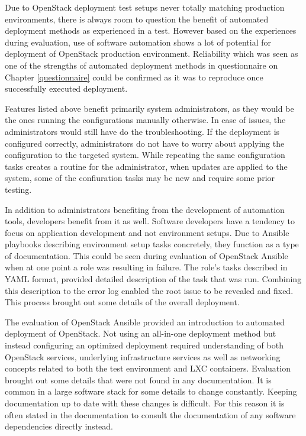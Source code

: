 Due to OpenStack deployment test setups never totally matching production
environments, there is always room to question the benefit of automated
deployment methods as experienced in a test. However based on the experiences
during evaluation, use of software automation shows a lot of potential for
deployment of OpenStack production environment. Reliability which was seen as
one of the strengths of automated deployment methods in questionnaire on
Chapter \ref{questionnaire} could be confirmed as it was to reproduce once
successfully executed deployment.

Features listed above benefit primarily system administrators, as they would be
the ones running the configurations manually otherwise. In case of issues, the
administrators would still have do the troubleshooting. If the deployment is
configured correctly, administrators do not have to worry about applying the
configuration to the targeted system. While repeating the same configuration
tasks creates a routine for the administrator, when updates are applied to the
system, some of the confiuration tasks may be new and require some prior
testing.

In addition to administrators benefiting from the development of automation
tools, developers benefit from it as well. Software developers have a tendency
to focus on application development and not environment setups. Due to Ansible
playbooks describing environment setup tasks concretely, they function as a
type of documentation. This could be seen during evaluation of OpenStack
Ansible when at one point a role was resulting in failure. The role's tasks
described in YAML format, provided detailed description of the task that was
run. Combining this description to the error log enabled the root issue to be
revealed and fixed. This process brought out some details of the overall
deployment.

The evaluation of OpenStack Ansible provided an introduction to automated
deployment of OpenStack. Not using an all-in-one deployment method but instead
configuring an optimized deployment required understanding of both OpenStack
services, underlying infrastructure services as well as networking concepts
related to both the test environment and LXC containers. Evaluation brought out
some details that were not found in any documentation. It is common in a large
software stack for some details to change constantly. Keeping documentation up
to date with these changes is difficult. For this reason it is often stated in
the documentation to consult the documentation of any software dependencies
directly instead.

